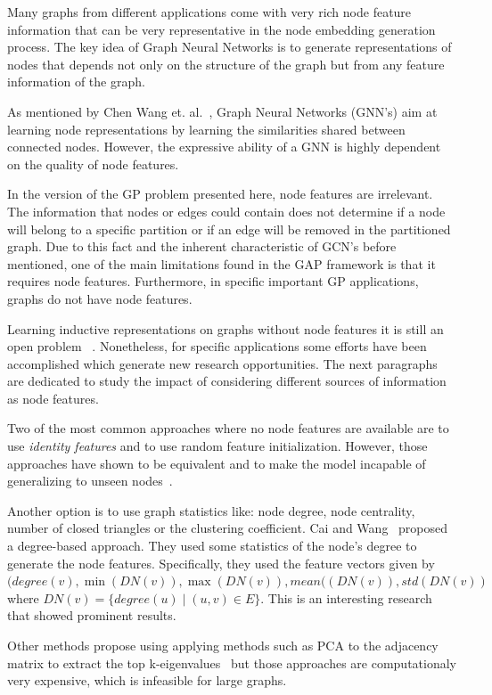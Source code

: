 Many graphs from different applications come with very rich node feature information that can be very representative in the node embedding generation process. The key idea of Graph Neural Networks is to generate representations of nodes that depends not only on the structure of the graph but from any feature information of the graph. 

As mentioned by Chen Wang et. al.~\cite{nodefeatures}, Graph Neural Networks (GNN's) aim at learning node representations by learning the similarities shared between connected nodes. However, the expressive ability of a GNN is highly dependent on the quality of node features.
 
In the version of the GP problem presented here, node features are irrelevant. The information that nodes or edges could contain does not determine if a node will belong to a specific partition or if an edge will be removed in the partitioned graph. Due to this fact and the inherent characteristic of GCN's before mentioned, one of the main limitations found in the GAP framework is that it requires node features. Furthermore, in specific important GP applications, graphs do not have node features. 

Learning inductive representations on graphs without node features it is still an open problem ~\cite{gnnsurvey}. Nonetheless, for specific applications some efforts have been accomplished which generate new research opportunities. The next paragraphs are dedicated to study the impact of considering different sources of information as node features.

Two of the most common approaches where no node features are available are to use \textit{identity features} and to use random feature initialization. However, those approaches have shown to be equivalent and to make the model incapable of generalizing to unseen nodes~\cite{hamilton}.

\sloppy Another option is to use graph statistics like: node degree, node centrality, number of closed triangles or the clustering coefficient.
Cai and Wang~\cite{nonattributed} proposed a degree-based approach. They used some statistics of the node's degree to generate the node features. Specifically, they used the feature vectors given by $(degree(v), \min(DN(v)), \max(DN(v)), mean((DN(v)), std(DN(v))$ where $DN(v)=\{degree(u)\mid (u,v)\in E\}$. This is an interesting research that showed prominent results.

Other methods propose using applying methods such as PCA to the adjacency matrix to extract the top k-eigenvalues~\cite{eigen, eigen2} but those approaches are computationaly very expensive, which is infeasible for large graphs.

